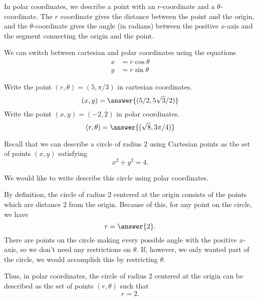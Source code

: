\documentclass{ximera}
\begin{document}
In polar coordinates, we describe a point with an $r$-coordinate and a $\theta$-coordinate. The $r$ coordinate gives the distance between the point and the origin, and the $\theta$-coordinate gives the angle (in radians) between the positive $x$-axis and the segment connecting the origin and the point.

We can switch between cartesian and polar coordinates using the equations
\begin{align*}
x&=r\cos\theta\\
y&=r\sin\theta
\end{align*}

\begin{image}
\end{image}

\begin{problem}
Write the point $(r,\theta) = (5, \pi/3)$ in cartesian coordinates.
\[
(x,y) = \answer{(5/2, 5\sqrt{3}/2)}
\]
Write the point $(x,y) = (-2,2)$ in polar coordinates.
\[
(r,\theta) = \answer{(\sqrt{8}, 3\pi/4)}
\]
\end{problem}

\begin{example}
Recall that we can describe a circle of radius 2 using Cartesian points as the set of points $(x,y)$ satisfying
\[
x^2+y^2 = 4.
\]

\begin{image}
\end{image}

We would like to write describe this circle using polar coordinates.

By definition, the circle of radius $2$ centered at the origin consists of the points which are distance $2$ from the origin. Because of this, for any point on the circle, we have
\[
r = \answer{2}.
\]
There are points on the circle making every possible angle with the positive $x$-axis, so we don't need any restrictions on $\theta$. If, however, we only wanted part of the circle, we would accomplish this by restricting $\theta$.

Thus, in polar coordinates, the circle of radius $2$ centered at the origin can be described as the set of points $(r,\theta)$ such that
\[
r = 2.
\]
\end{example}
\end{document}

